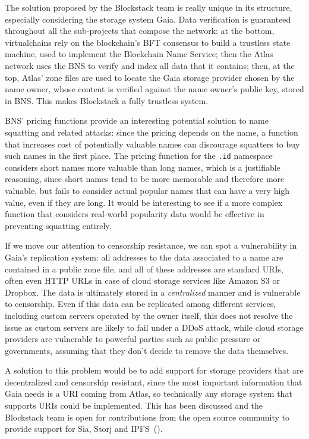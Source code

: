 \documentclass[mscthesis]{usiinfthesis}
\begin{document}
The solution proposed by the Blockstack team is really unique in its structure, especially considering the storage system Gaia. Data verification is guaranteed throughout all the sub-projects that compose the network: at the bottom, virtualchains rely on the blockchain's BFT consensus to build a trustless state machine, used to implement the Blockchain Name Service; then the Atlas network uses the BNS to verify and index all data that it contains; then, at the top, Atlas' zone files are used to locate the Gaia storage provider chosen by the name owner, whose content is verified against the name owner's public key, stored in BNS. This makes Blockstack a fully trustless system.

BNS' pricing functions provide an interesting potential solution to name squatting and related attacks: since the pricing depends on the name, a function that increases cost of potentially valuable names can discourage squatters to buy such names in the first place. The pricing function for the \texttt{.id} namespace considers short names more valuable than long names, which is a justifiable reasoning, since short names tend to be more memorable and therefore more valuable, but fails to consider actual popular names that can have a very high value, even if they are long. It would be interesting to see if a more complex function that considers real-world popularity data would be effective in preventing squatting entirely.

If we move our attention to censorship resistance, we can spot a vulnerability in Gaia's replication system: all addresses to the data associated to a name are contained in a public zone file, and all of these addresses are standard URIs, often even HTTP URLs in case of cloud storage services like Amazon S3 or Dropbox. The data is ultimately stored in a \emph{centralized} manner and is vulnerable to censorship. Even if this data can be replicated among different services, including custom servers operated by the owner itself, this does not resolve the issue as custom servers are likely to fail under a DDoS attack, while cloud storage providers are vulnerable to powerful parties such as public pressure or governments, assuming that they don't decide to remove the data themselves.

A solution to this problem would be to add support for storage providers that are decentralized and censorship resistant, since the most important information that Gaia needs is a URI coming from Atlas, so technically any storage system that supports URIs could be implemented. This has been discussed and the Blockstack team is open for contributions from the open source community to provide support for Sia, Storj and IPFS~(\cite{website:gaiaimprovements}).
\end{document}
